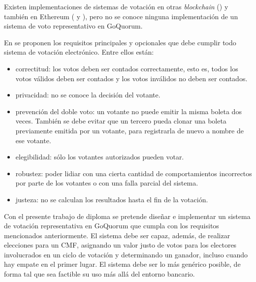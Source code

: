Existen implementaciones de sistemas de votaci\'on en otras \textit{blockchain} (\cite{agora}) y tambi\'en en Ethereum (\cite{ovn} y \cite{borda_count}), pero no se conoce ninguna implementaci\'on de un sistema de voto representativo en GoQuorum.


En \cite{wang2017review} se proponen los requisitos principales y opcionales que debe cumplir todo sistema de votaci\'on electr\'onico. Entre ellos est\'an:
\begin{itemize}
    \item correctitud: los votos deben ser contados correctamente, esto es, todos los votos v\'alidos deben ser contados y los votos inv\'alidos no deben ser contados.

    \item privacidad: no se conoce la decisi\'on del votante.

    \item prevenci\'on del doble voto: un votante no puede emitir la misma boleta dos veces. También se debe evitar que un tercero pueda clonar una boleta previamente emitida por un votante, para registrarla de nuevo a nombre de ese votante.

    \item elegibilidad: s\'olo los votantes autorizados pueden votar.

    \item robustez: poder lidiar con una cierta cantidad de comportamientos incorrectos por parte de los votantes o con una falla parcial del sistema.

    \item justeza: no se calculan los resultados hasta el fin de la votaci\'on.

\end{itemize}

Con el presente trabajo de diploma  se pretende dise\~nar e implementar un sistema de votaci\'on representativa en GoQuorum que cumpla con los requisitos mencionados anteriormente. El sistema debe ser capaz, adem\'as, de realizar elecciones para un CMF, asignando un valor justo de votos para los electores involucrados en un ciclo de votaci\'on y determinando un ganador, incluso cuando hay empate en el primer lugar. El sistema debe ser lo m\'as gen\'erico posible, de forma tal que sea factible su uso m\'as all\'a del entorno bancario.







